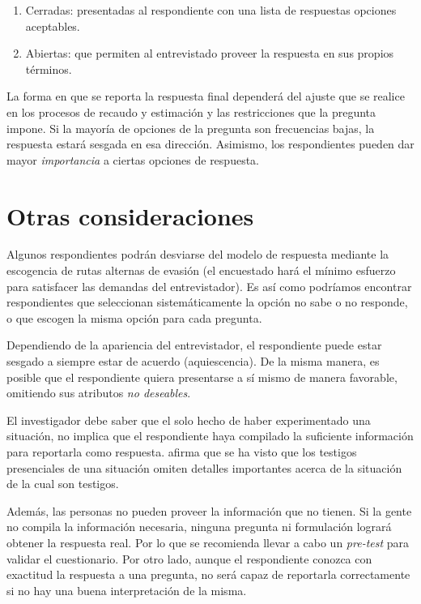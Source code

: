 \documentclass[
  10pt,
  spanish,
]{book}
\providecommand{\tightlist}{%
  \setlength{\itemsep}{0pt}\setlength{\parskip}{0pt}}
\begin{document}
\begin{enumerate}
\def\labelenumi{\arabic{enumi}.}
\tightlist
\item
  Cerradas: presentadas al respondiente con una lista de respuestas opciones aceptables.
\item
  Abiertas: que permiten al entrevistado proveer la respuesta en sus propios términos.
\end{enumerate}

La forma en que se reporta la respuesta final dependerá del ajuste que se realice en los procesos de recaudo y estimación y las restricciones que la pregunta impone. Si la mayoría de opciones de la pregunta son frecuencias bajas, la respuesta estará sesgada en esa dirección. Asimismo, los respondientes pueden dar mayor \emph{importancia} a ciertas opciones de respuesta.

\hypertarget{otras-consideraciones}{%
\section{Otras consideraciones}\label{otras-consideraciones}}

Algunos respondientes podrán desviarse del modelo de respuesta mediante la escogencia de rutas alternas de evasión (el encuestado hará el mínimo esfuerzo para satisfacer las demandas del entrevistador). Es así como podríamos encontrar respondientes que seleccionan sistemáticamente la opción no sabe o no responde, o que escogen la misma opción para cada pregunta.

Dependiendo de la apariencia del entrevistador, el respondiente puede estar sesgado a siempre estar de acuerdo (aquiescencia). De la misma manera, es posible que el respondiente quiera presentarse a sí mismo de manera favorable, omitiendo sus atributos \emph{no deseables}.

El investigador debe saber que el solo hecho de haber experimentado una situación, no implica que el respondiente haya compilado la suficiente información para reportarla como respuesta. \citet{Groves_Fowler_Couper_Lepkowski_Singer_Tourangeau_2009} afirma que se ha visto que los testigos presenciales de una situación omiten detalles importantes acerca de la situación de la cual son testigos.

Además, las personas no pueden proveer la información que no tienen. Si la gente no compila la información necesaria, ninguna pregunta ni formulación logrará obtener la respuesta real. Por lo que se recomienda llevar a cabo un \emph{pre-test} para validar el cuestionario. Por otro lado, aunque el respondiente conozca con exactitud la respuesta a una pregunta, no será capaz de reportarla correctamente si no hay una buena interpretación de la misma.
\end{document}
